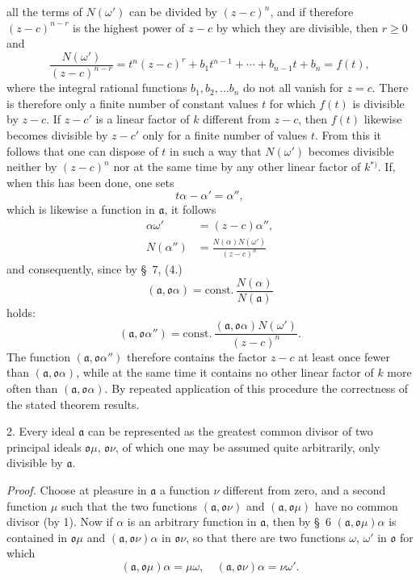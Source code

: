 \documentclass{article}
\begin{document}
all the terms of $N(\omega')$ can be divided by $(z-c)^{n}$, and if therefore $(z-c)^{n-r}$ is the highest power of $z-c$ by which they are divisible, then $r \geqslant 0$ and
\[ \frac{N(\omega')}{(z-c)^{n-r}} = t^{n}(z-c)^{r} + b_{1}t^{n-1} + \cdots + b_{n-1}t + b_{n} = f(t), \]
where the integral rational functions $b_{1}, b_{2}, \ldots b_{n}$ do not all vanish for $z = c$. There is therefore only a finite number of constant values $t$ for which $f(t)$ is divisible by $z-c$. If $z-c'$ is a linear factor of $k$ different from $z-c$, then $f(t)$ likewise becomes divisible by $z-c'$ only for a finite number of values $t$. From this it follows that one can dispose of $t$ in such a way that $N(\omega')$ becomes divisible neither by $(z-c)^{n}$ nor at the same time by any other linear factor of $k$${}^{*)}$. If, when this has been done, one sets
\[ t\alpha - \alpha' = \alpha'', \]
which is likewise a function in $\mathfrak{a}$, it follows
\[ \begin{aligned} \alpha\omega' &= (z-c)\alpha'', \\ N(\alpha'') &= \frac{N(\alpha)N(\omega')}{(z-c)^{n}} \end{aligned} \]
and consequently, since by §~7, (4.)
\[ (\mathfrak{a}, \mathfrak{o}\alpha) = \text{const.}\,\frac{N(\alpha)}{N(\mathfrak{a})} \]
holds:
\[ (\mathfrak{a}, \mathfrak{o}\alpha'') = \text{const.}\,\frac{(\mathfrak{a}, \mathfrak{o}\alpha)N(\omega')}{(z-c)^{n}}. \]
The function $(\mathfrak{a}, \mathfrak{o}\alpha'')$ therefore contains the factor $z-c$ at least once fewer than $(\mathfrak{a}, \mathfrak{o}\alpha)$, while at the same time it contains no other linear factor of $k$ more often than $(\mathfrak{a}, \mathfrak{o}\alpha)$. By repeated application of this procedure the correctness of the stated theorem results.

2. Every ideal $\mathfrak{a}$ can be represented as the greatest common divisor of two principal ideals $\mathfrak{o}\mu$, $\mathfrak{o}\nu$, of which one may be assumed quite arbitrarily, only divisible by $\mathfrak{a}$.

\emph{Proof.} Choose at pleasure in $\mathfrak{a}$ a function $\nu$ different from zero, and a second function $\mu$ such that the two functions $(\mathfrak{a}, \mathfrak{o}\nu)$ and $(\mathfrak{a}, \mathfrak{o}\mu)$ have no common divisor (by 1). Now if $\alpha$ is an arbitrary function in $\mathfrak{a}$, then by §~6 $(\mathfrak{a}, \mathfrak{o}\mu)\alpha$ is contained in $\mathfrak{o}\mu$ and $(\mathfrak{a}, \mathfrak{o}\nu)\alpha$ in $\mathfrak{o}\nu$, so that there are two functions $\omega$, $\omega'$ in $\mathfrak{o}$ for which
\[ (\mathfrak{a}, \mathfrak{o}\mu)\alpha = \mu\omega, \quad (\mathfrak{a}, \mathfrak{o}\nu)\alpha = \nu\omega'. \]
\end{document}
